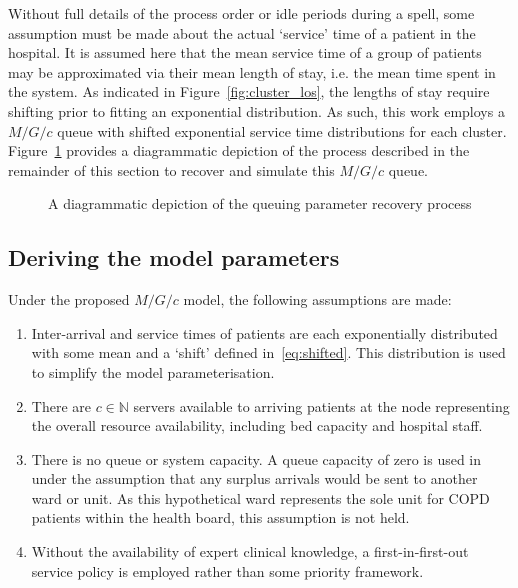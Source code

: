 \documentclass[]{interact}
\theoremstyle{plain}%
\theoremstyle{definition}
\theoremstyle{remark}
\begin{document}
Without full details of the process order or idle periods during a spell, some
assumption must be made about the actual `service' time of a patient in the
hospital. It is assumed here that the mean service time of a group of patients
may be approximated via their mean length of stay, i.e. the mean time spent in
the system. As indicated in Figure~\ref{fig:cluster_los}, the lengths of stay
require shifting prior to fitting an exponential distribution. As such, this
work employs a \(M/G/c\) queue with shifted exponential service time
distributions for each cluster. Figure~\ref{fig:process} provides a diagrammatic
depiction of the process described in the remainder of this section to recover
and simulate this \(M/G/c\) queue.

\begin{figure}
    \centering%
    \resizebox{!}{.9\textheight}{}
    \caption{%
        A diagrammatic depiction of the queuing parameter recovery process
    }\label{fig:process}
\end{figure}


\subsection{Deriving the model parameters}\label{subsec:derive}

Under the proposed \(M/G/c\) model, the following assumptions are made:

\begin{enumerate}
    \item Inter-arrival and service times of patients are each exponentially
        distributed with some mean and a `shift' defined in~\eqref{eq:shifted}.
        This distribution is used to simplify the model parameterisation.
    \item There are \(c \in \mathbb{N}\) servers available to arriving patients
        at the node representing the overall resource availability, including
        bed capacity and hospital staff.
    \item There is no queue or system capacity. A queue capacity of zero is used
        in~\cite{Williams2015} under the assumption that any surplus arrivals
        would be sent to another ward or unit. As this hypothetical ward
        represents the sole unit for COPD patients within the health board, this
        assumption is not held.
    \item Without the availability of expert clinical knowledge, a
        first-in-first-out service policy is employed rather than some priority
        framework.
\end{enumerate}
\end{document}

